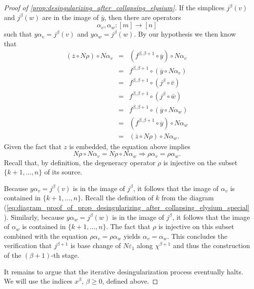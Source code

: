 \begin{proof}[Proof of \cref{prop:desingularizing_after_collapsing_elysium}]
If the simplices $j^\beta (v)$ and $j^\beta (w)$ are in the image of $\bar{y}$, then there are operators
\[\alpha _v,\alpha _w:[m]\to [n]\]
such that $y\alpha _v=j^\beta (v)$ and $y\alpha _w=j^\beta (w)$. By our hypothesis we then know that
\begin{displaymath}
\begin{array}{rcl}
(\overline{z} \circ N\rho )\circ N\alpha _v & = & (f^{\beta ,\beta +1} \circ \overline{y} )\circ N\alpha _v \\
& = & f^{\beta ,\beta +1} \circ (\overline{y} \circ N\alpha _v) \\
& = & f^{\beta ,\beta +1} \circ (j^\beta \circ \bar{v} ) \\
& = & f^{\beta ,\beta +1} \circ (j^\beta \circ \bar{w} ) \\
& = & f^{\beta ,\beta +1} \circ (\overline{y} \circ N\alpha _w) \\
& = & (f^{\beta ,\beta +1} \circ \overline{y} )\circ N\alpha _w \\
& = & (\overline{z} \circ N\rho )\circ N\alpha _w.
\end{array}
\end{displaymath}
Given the fact that $z$ is embedded, the equation above implies
\[N\rho \circ N\alpha _v=N\rho \circ N\alpha _w\Rightarrow \rho \alpha _v=\rho \alpha _w.\]
Recall that, by definition, the degeneracy operator $\rho$ is injective on the subset $\{ k+1,\dots ,n\}$ of its source.

Because $y\alpha _v=j^\beta (v)$ is in the image of $j^\beta$, it follows that the image of $\alpha _v$ is contained in $\{ k+1,\dots ,n\}$. Recall the definition of $k$ from the diagram (\ref{eq:diagram_proof_of_prop_desingularizing_after_collapsing_elysium_special}). Similarly, because $y\alpha _w=j^\beta (w)$ is in the image of $j^\beta$, it follows that the image of $\alpha _w$ is contained in $\{ k+1,\dots ,n\}$. The fact that $\rho$ is injective on this subset combined with the equation $\rho \alpha _v=\rho \alpha _w$ yields $\alpha _v=\alpha _w$. This concludes the verification that $j^{\beta +1}$ is base change of $N\varepsilon _1$ along $\chi ^{\beta +1}$ and thus the construction of the $(\beta +1)$-th stage.

It remains to argue that the iterative desingularization process eventually halts. We will use the indices $x^\beta$, $\beta \geq 0$, defined above.


\end{proof}
